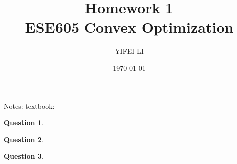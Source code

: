 \documentclass[12pt]{amsart}
\title{Homework 1 \\ ESE605 Convex Optimization}
\author{YIFEI LI}
\date{\today}
\theoremstyle{definition}
\newtheorem{question}{Question}
\theoremstyle{remark}
\theoremstyle{definition}
\begin{document}
\maketitle

Notes: textbook: 

\begin{question}

\end{question}

\begin{question}
  
\end{question}

\begin{question}
  
\end{question}
\end{document}
